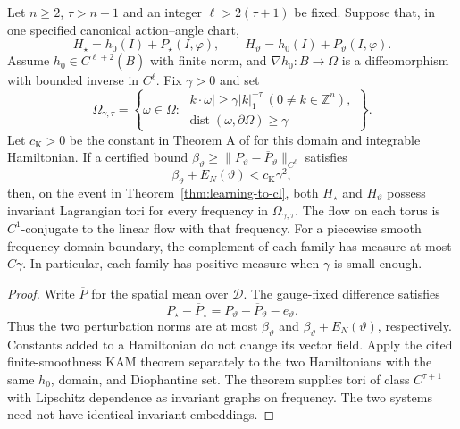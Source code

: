 \begin{corollary}
\label{cor:common-target-kam}
Let $n\geq2$, $\tau>n-1$ and an integer $\ell>2(\tau+1)$ be fixed.
Suppose that, in one specified canonical action--angle chart,
\[
 H_\star=h_0(I)+P_\star(I,\varphi),\qquad
 H_\vartheta=h_0(I)+P_\vartheta(I,\varphi).
\]
Assume $h_0\in C^{\ell+2}(\overline B)$ with finite norm, and
$\nabla h_0:B\to\Omega$ is a diffeomorphism with bounded inverse in $C^\ell$.
Fix $\gamma>0$ and set
\begin{equation}
 \Omega_{\gamma,\tau}=\left\{\omega\in\Omega:\begin{array}{l}
 |k\cdot\omega|\geq\gamma |k|_1^{-\tau}\ (0\ne k\in\mathbb Z^n),\\
 \operatorname{dist}(\omega,\partial\Omega)\geq\gamma
 \end{array}\right\}.
\end{equation}
Let $c_{\mathrm K}>0$ be the constant in Theorem A of
\citet{bounemoura} for this domain and integrable Hamiltonian.
If a certified bound $\beta_\vartheta\geq
\|P_\vartheta-\overline P_\vartheta\|_{C^\ell}$ satisfies
\begin{equation}
 \beta_\vartheta+E_N(\vartheta)<c_{\mathrm K}\gamma^2,
 \label{eq:joint-kam-budget}
\end{equation}
then, on the event in Theorem~\ref{thm:learning-to-cl}, both $H_\star$ and
$H_\vartheta$ possess invariant Lagrangian tori for every frequency in
$\Omega_{\gamma,\tau}$. The flow on each torus is $C^1$-conjugate to the
linear flow with that frequency. For a piecewise smooth frequency-domain
boundary, the complement of each family has measure at most $C\gamma$.
In particular, each family has positive measure when $\gamma$ is small enough.
\end{corollary}

\begin{proof}
Write $\overline P$ for the spatial mean over $\mathcal D$.
The gauge-fixed difference satisfies
\[
 P_\star-\overline P_\star
   =P_\vartheta-\overline P_\vartheta-e_\vartheta.
\]
Thus the two perturbation norms are at most $\beta_\vartheta$ and
$\beta_\vartheta+E_N(\vartheta)$, respectively. Constants added to a
Hamiltonian do not change its vector field. Apply the cited finite-smoothness
KAM theorem separately to the two Hamiltonians with the same $h_0$,
domain, and Diophantine set. The theorem supplies tori of class
$C^{\tau+1}$ with Lipschitz dependence as invariant graphs on frequency.
The two systems need not have identical invariant embeddings.
\end{proof}

